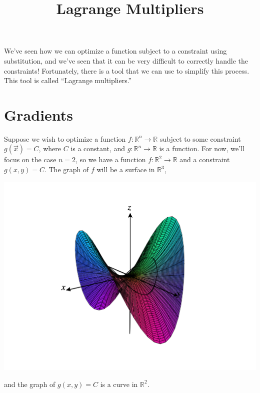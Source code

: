 \documentclass{ximera}
\title{Lagrange Multipliers}
\begin{document}
\begin{abstract}
\end{abstract}
\maketitle

We've seen how we can optimize a function subject to a constraint using substitution, and we've seen that it can be very difficult to correctly handle the constraints! Fortunately, there is a tool that we can use to simplify this process. This tool is called ``Lagrange multipliers.''

\section*{Gradients}

Suppose we wish to optimize a function $f:\mathbb{R}^n\rightarrow\mathbb{R}$ subject to some constraint $g(\vec{x}) = C$, where $C$ is a constant, and $g:\mathbb{R}^n\rightarrow\mathbb{R}$ is a function. For now, we'll focus on the case $n=2$, so we have a function $f:\mathbb{R}^2\rightarrow\mathbb{R}$ and a constraint $g(x,y) = C$. The graph of $f$ will be a surface in $\mathbb{R}^3$, 

\begin{image}
\includegraphics[width = \textwidth]{CalcPlot3D-surface}
\end{image}

and the graph of $g(x,y) = C$ is a curve in $\mathbb{R}^2$.

\begin{image}
\end{image}
\end{document}
